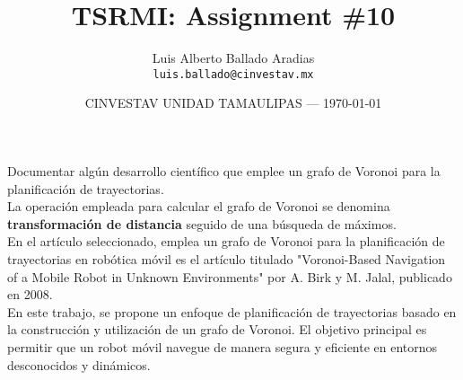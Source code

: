\documentclass{article}
\title{TSRMI: Assignment \#10} %
\author{Luis Alberto Ballado Aradias\\ \texttt{luis.ballado@cinvestav.mx}} %
\date{CINVESTAV UNIDAD TAMAULIPAS --- \today} %
\begin{document}
\maketitle %


Documentar algún desarrollo científico que emplee un grafo de Voronoi para la planificación de trayectorias. \\
La operación empleada para calcular el grafo de Voronoi se denomina \textbf{transformación de distancia} seguido de una búsqueda de máximos.\\

En el artículo seleccionado, emplea un grafo de Voronoi para la planificación de trayectorias en robótica móvil es el artículo titulado "Voronoi-Based Navigation of a Mobile Robot in Unknown Environments" por A. Birk y M. Jalal, publicado en 2008.\\

En este trabajo, se propone un enfoque de planificación de trayectorias basado en la construcción y utilización de un grafo de Voronoi. El objetivo principal es permitir que un robot móvil navegue de manera segura y eficiente en entornos desconocidos y dinámicos.
\end{document}
